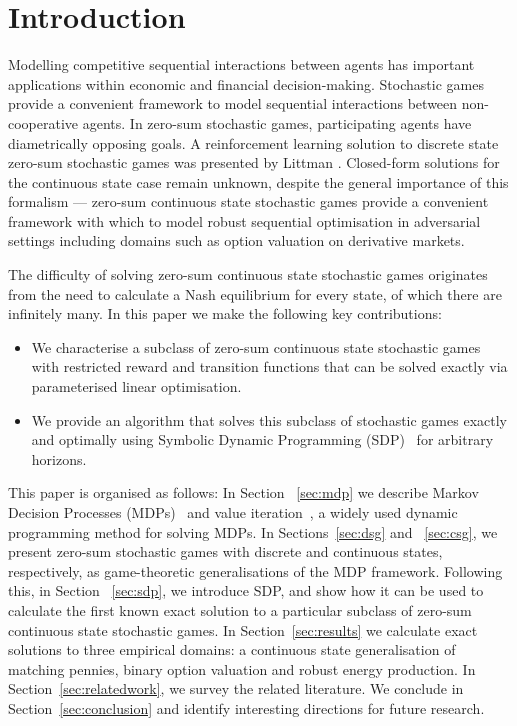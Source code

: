 \section{Introduction}

Modelling competitive sequential interactions between agents has
important applications within economic and financial decision-making.
Stochastic games \cite{Shapley_PotNAoS_1953} provide a convenient
framework to model sequential interactions between non-cooperative
agents. In zero-sum stochastic games, participating agents have
diametrically opposing goals. A reinforcement learning solution to
discrete state zero-sum stochastic games was presented by Littman
\cite{Littman_ICML_1994}.  Closed-form solutions for the continuous
state case remain unknown, despite the general importance of this
formalism --- zero-sum continuous state stochastic games provide a
convenient framework with which to model robust sequential
optimisation in adversarial settings including domains such as option valuation on derivative
markets.

The difficulty of solving zero-sum continuous state stochastic games
originates from the need to calculate a Nash equilibrium for every state,
of which there are infinitely many. In this paper we make the following 
key contributions:
\begin{itemize}
  \item We characterise a subclass of zero-sum continuous state stochastic
    games with restricted reward and transition functions that can be
    solved exactly via parameterised linear optimisation.
  \item We provide an algorithm that solves this subclass of
    stochastic games exactly and optimally using Symbolic Dynamic
    Programming (SDP)~\cite{Boutilier_IJCAI_2001,Sanner_UAI_2011,Zamani_AAAI_2012}
     for arbitrary horizons.
\end{itemize}

This paper is organised as follows: In Section ~\ref{sec:mdp} we describe Markov 
Decision Processes (MDPs)~\cite{Howard_1960} and value iteration~\cite{Bellman_1957}, 
a widely used dynamic programming method for solving MDPs. In Sections~\ref{sec:dsg} and
~\ref{sec:csg}, we present zero-sum stochastic games with discrete and continuous states, respectively,
as game-theoretic generalisations of the MDP framework. Following this, in Section ~\ref{sec:sdp}, we 
introduce SDP, and show how it can be used to calculate the first known exact solution 
to a particular subclass of zero-sum continuous state stochastic games. In Section~\ref{sec:results} 
we calculate exact solutions to three empirical domains: a continuous state generalisation of matching pennies, 
binary option valuation and robust energy production. In Section~\ref{sec:relatedwork}, we
survey the related literature. We conclude in Section~\ref{sec:conclusion} and identify
interesting directions for future research.